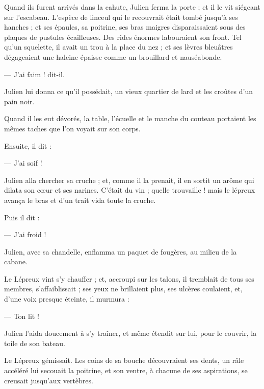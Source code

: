 \documentclass[]{book}
\begin{document}
                Quand ils furent arrivés dans la cahute, Julien ferma la porte ; et il le vit siégeant sur l'escabeau. L'espèce de linceul qui le recouvrait était tombé jusqu'à ses hanches ; et ses épaules, sa poitrine, ses bras maigres disparaissaient sous des plaques de pustules écailleuses. Des rides énormes labouraient son front. Tel qu'un squelette, il avait un trou à la place du nez ; et ses lèvres bleuâtres dégageaient une haleine épaisse comme un brouillard et nauséabonde.
                    
                — J'ai faim ! dit-il.
                    
                Julien lui donna ce qu'il possédait, un vieux quartier de lard et les croûtes d'un pain noir.
                    
                Quand il les eut dévorés, la table, l'écuelle et le manche du couteau portaient les mêmes taches que l'on voyait sur son corps.
                    
                Ensuite, il dit :
                    
                — J'ai soif !
                    
                Julien alla chercher sa cruche ; et, comme il la prenait, il en sortit un arôme qui dilata son cœur et ses narines. C'était du vin ; quelle trouvaille ! mais le lépreux avança le bras et d'un trait vida toute la cruche.
                    
                Puis il dit :
                    
                — J'ai froid !
                    
                Julien, avec sa chandelle, enflamma un paquet de fougères, au milieu de la cabane.
                    
                Le Lépreux vint s'y chauffer ; et, accroupi sur les talons, il tremblait de tous ses membres, s'affaiblissait ; ses yeux ne brillaient plus, ses ulcères coulaient, et, d'une voix presque éteinte, il murmura :
                    
                — Ton lit !
                    
                Julien l'aida doucement à s'y traîner, et même étendit sur lui, pour le couvrir, la toile de son bateau.
                    
                Le Lépreux gémissait. Les coins de sa bouche découvraient ses dents, un râle accéléré lui secouait la poitrine, et son ventre, à chacune de ses aspirations, se creusait jusqu'aux vertèbres.
                    
\end{document}
